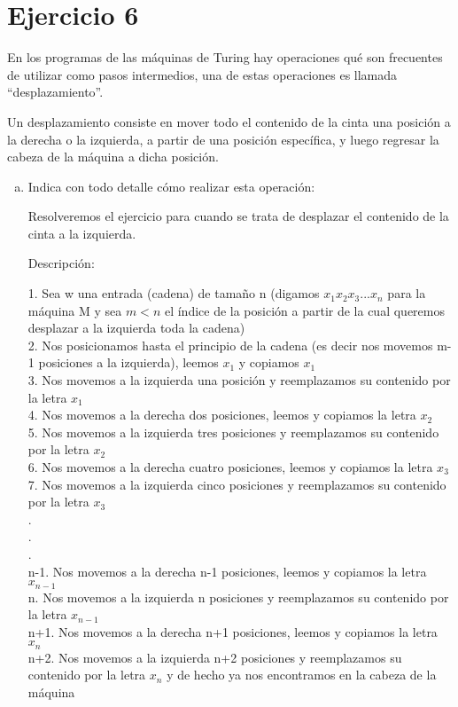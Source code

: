 \documentclass[12pt,letterpaper]{article}
\begin{document}
    
\section*{Ejercicio 6}

En los programas de las máquinas de Turing hay operaciones qué son frecuentes de utilizar como pasos intermedios, una de estas operaciones es llamada “desplazamiento”.

Un desplazamiento consiste en mover todo el contenido de la cinta una posición a la derecha o la izquierda, a partir de una posición específica, y luego regresar la cabeza de la máquina
a dicha posición.

\begin{enumerate}[a.]
    \item Indica con todo detalle cómo realizar esta operación:

Resolveremos el ejercicio para cuando se trata de desplazar el contenido de la cinta a la izquierda.

Descripción:

1. Sea w una entrada (cadena) de tamaño n (digamos $x_1x_2x_3...x_n$ para la máquina M y sea $m<n$ el índice de la posición a partir de la cual queremos desplazar a la izquierda toda la cadena)\\
2. Nos posicionamos hasta el principio de la cadena (es decir nos movemos m-1 posiciones a la izquierda), leemos $x_1$ y copiamos $x_1$ \\
3. Nos movemos a la izquierda una posición y reemplazamos su contenido por la letra $x_1$\\
4. Nos movemos a la derecha dos posiciones, leemos y copiamos la letra $x_2$ \\
5. Nos movemos a la izquierda tres posiciones y reemplazamos su contenido por la letra $x_2$\\
6. Nos movemos a la derecha cuatro posiciones, leemos y copiamos la letra $x_3$ \\
7. Nos movemos a la izquierda cinco posiciones y reemplazamos su contenido por la letra $x_3$\\
.\\
.\\
.\\
n-1. Nos movemos a la derecha n-1 posiciones, leemos y copiamos la letra $x_{n-1}$\\ 
n.  Nos movemos a la izquierda n posiciones y reemplazamos su contenido por la letra $x_{n-1}$\\
n+1. Nos movemos a la derecha n+1 posiciones, leemos y copiamos la letra $x_{n}$\\ 
n+2.  Nos movemos a la izquierda n+2 posiciones y reemplazamos su contenido por la letra $x_{n}$ y de hecho ya nos encontramos en la cabeza de la máquina\\
    

\end{enumerate}
\end{document}

